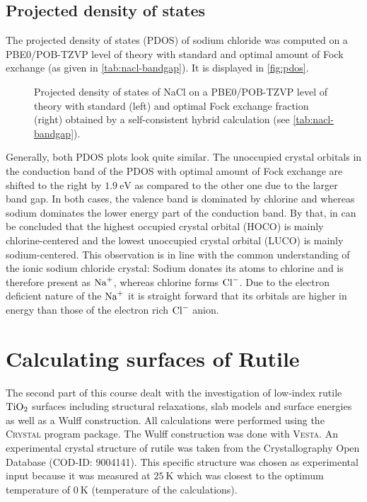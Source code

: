 \documentclass[a4paper,12pt]{scrartcl}
\begin{document}
\subsection{Projected density of states}
%
The projected density of states (PDOS) of sodium chloride was computed on a PBE0/POB-TZVP level of theory with standard and optimal amount of Fock exchange (as given in \autoref{tab:nacl-bandgap}). It is displayed in \autoref{fig:pdos}.
%
\begin{figure}[H]
	\centering
	
	\vspace{-20pt}
	\caption{Projected density of states of NaCl on a PBE0/POB-TZVP level of theory with standard (left) and optimal Fock exchange fraction (right) obtained by a self-consistent hybrid calculation (see \autoref{tab:nacl-bandgap}).}
	\label{fig:pdos}
\end{figure}
%
Generally, both PDOS plots look quite similar. The unoccupied crystal orbitals in the conduction band of the PDOS with optimal amount of Fock exchange are shifted to the right by $ \SI{1.9}{\electronvolt} $ as compared to the other one due to the larger band gap. In both cases, the valence band is dominated by chlorine and whereas sodium dominates the lower energy part of the conduction band. By that, in can be concluded that the highest occupied crystal orbital (HOCO) is mainly chlorine-centered and the lowest unoccupied crystal orbital (LUCO) is mainly sodium-centered. This observation is in line with the common understanding of the ionic sodium chloride crystal: Sodium donates its atoms to chlorine and is therefore present as $ \ce{Na^+} $, whereas chlorine forms $ \ce{Cl^-} $. Due to the electron deficient nature of the $ \ce{Na^+} $ it is straight forward that its orbitals are higher in energy than those of the electron rich $ \ce{Cl^-} $ anion.
%
\newpage
\section{Calculating surfaces of Rutile}
%
The second part of this course dealt with the investigation of low-index rutile $ \ce{TiO2}$ surfaces including structural relaxations, slab models and surface energies as well as a Wulff construction. All calculations were performed using the \textsc{Crystal} program package. The Wulff construction was done with \textsc{Vesta}\autocite[]{vesta}. An experimental crystal structure of rutile was taken from the Crystallography Open Database (COD-ID: 9004141). This specific structure was chosen as experimental input because it was measured at $ \SI{25}{\kelvin} $ which was closest to the optimum temperature of $ \SI{0}{\kelvin} $ (temperature of the calculations).
%
\end{document}
